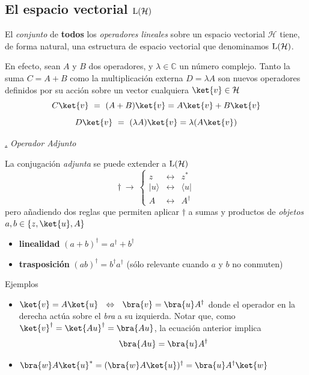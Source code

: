 \documentclass[a4paper,11pt]{book} %
\numberwithin{equation}{chapter}
\def\subsubiContadorIt{\par\addtocounter{subsubsection}{1}\underline{\it\thesubsubsection.}\hskip0.5cm \setcounter{subsubsubsectionIt}{0}}
\newcommand{\SubsubiIt}[1]{
		\subsubiContadorIt \textit{#1}
	}
\newcounter{subsubsubsectionIt}[subsubsection]
\begin{document}
		\subsection{El espacio vectorial ${\rm L}(\mathcal{H})$}

El \textit{conjunto} de \textbf{todos} los \textit{operadores lineales} sobre un espacio vectorial $\mathcal{H}$ tiene, de forma natural, una estructura de espacio vectorial que denominamos ${\rm L}(\mathcal{H})$.

En efecto, sean $A$ y $B$ dos operadores, y $\lambda\in {\mathbb{C}}$ un número complejo. Tanto la suma $C = A+B$ como la multiplicación externa $D=\lambda A$ son nuevos operadores definidos por su acción sobre un vector cualquiera $\ket{v}\in \mathcal{H}$
	\begin{equation}
	C\ket{v} ~=~ (A + B) \ket{v} = A\ket{v} + B\ket{v}
	\end{equation}
	\begin{equation}
	D\ket{v} ~=~ (\lambda A) \ket{v} = \lambda (A\ket{v})
	\end{equation}


			\SubsubiIt{Operador Adjunto}

La conjugación \textit{adjunta} se puede extender a ${\rm L}(\mathcal{H})$
	\begin{equation}
	\dagger ~\to ~
\left\{
\begin{matrix}
z & \leftrightarrow  &  z^* \\
|u\rangle & \leftrightarrow &   \langle u | \\
A & \leftrightarrow & A^{\dagger}
\end{matrix}
\right.
	\end{equation}
pero añadiendo dos reglas que permiten aplicar $\dagger$ a sumas y productos de \textit{objetos} $a,b \in\{z,\ket{u},A\}$
\begin{itemize}
	\item \textbf{linealidad} $( a + b)^\dagger = a^\dagger + b^\dagger $
	\item \textbf{trasposición} $(ab)^\dagger = b^\dagger a^\dagger$ (sólo relevante cuando $a$ y $b$ no conmuten)
\end{itemize}

	\begin{mybox_green}{Ejemplos}
	\begin{itemize}
		\item $\ket{v} = A\ket{u} ~~\Leftrightarrow ~~\bra{v} = \bra{u}A^\dagger$ donde el operador en la derecha actúa sobre el \textit{bra} a su izquierda.
		Notar que, como $\ket{v}^\dagger=\ket{Au}^\dagger = \bra{Au}$, la ecuación anterior implica
		$$
		\bra{Au} = \bra{u} A^\dagger
		$$
		\item $\bra{w}A\ket{u}^* = (\bra{w}A\ket{u})^\dagger = \bra{u}A^\dagger\ket{w}$

	\end{itemize}
	\end{mybox_green}
\end{document}
